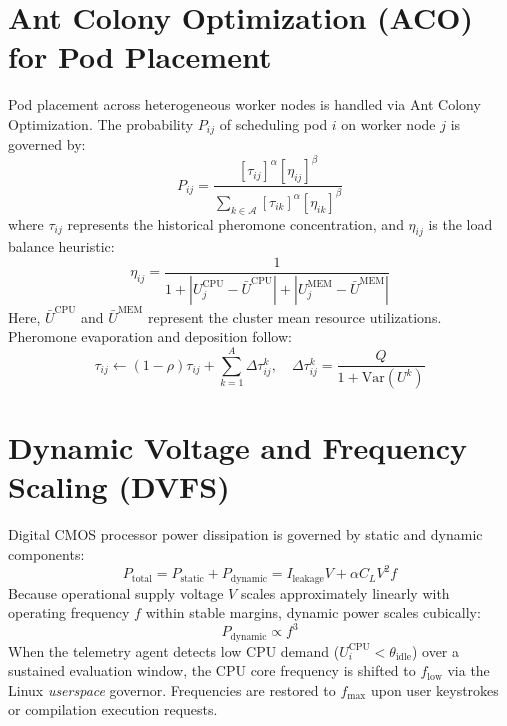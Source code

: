 \documentclass[12pt,a4paper]{report}
\begin{document}
	\section{Ant Colony Optimization (ACO) for Pod Placement}
	Pod placement across heterogeneous worker nodes is handled via Ant Colony Optimization. The probability $P_{ij}$ of scheduling pod $i$ on worker node $j$ is governed by:
	\begin{equation}
		P_{ij} = \frac{[\tau_{ij}]^\alpha [\eta_{ij}]^\beta}{\sum_{k \in \mathcal{A}} [\tau_{ik}]^\alpha [\eta_{ik}]^\beta}
	\end{equation}
	where $\tau_{ij}$ represents the historical pheromone concentration, and $\eta_{ij}$ is the load balance heuristic:
	\begin{equation}
		\eta_{ij} = \frac{1}{1 + |U_j^{\text{CPU}} - \bar{U}^{\text{CPU}}| + |U_j^{\text{MEM}} - \bar{U}^{\text{MEM}}|}
	\end{equation}
	Here, $\bar{U}^{\text{CPU}}$ and $\bar{U}^{\text{MEM}}$ represent the cluster mean resource utilizations. Pheromone evaporation and deposition follow:
	\begin{equation}
		\tau_{ij} \leftarrow (1 - \rho)\tau_{ij} + \sum_{k=1}^A \Delta \tau_{ij}^k, \quad \Delta \tau_{ij}^k = \frac{Q}{1 + \mathrm{Var}(U^k)}
	\end{equation}
	
	\section{Dynamic Voltage and Frequency Scaling (DVFS)}
	Digital CMOS processor power dissipation is governed by static and dynamic components:
	\begin{equation}
		P_{\text{total}} = P_{\text{static}} + P_{\text{dynamic}} = I_{\text{leakage}} V + \alpha C_L V^2 f
	\end{equation}
	Because operational supply voltage $V$ scales approximately linearly with operating frequency $f$ within stable margins, dynamic power scales cubically:
	\begin{equation}
		P_{\text{dynamic}} \propto f^3
	\end{equation}
	When the telemetry agent detects low CPU demand ($U_i^{\text{CPU}} < \theta_{\text{idle}}$) over a sustained evaluation window, the CPU core frequency is shifted to $f_{\text{low}}$ via the Linux \textit{userspace} governor. Frequencies are restored to $f_{\max}$ upon user keystrokes or compilation execution requests.
	
\end{document}
